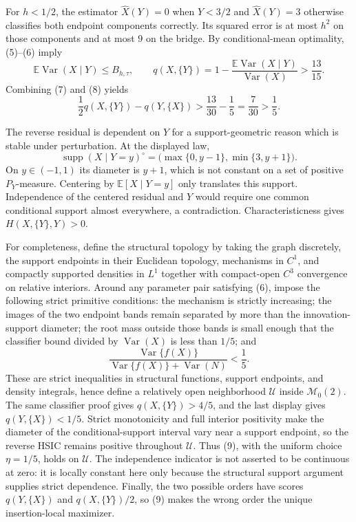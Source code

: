 For \(h<1/2\), the estimator \(\widehat X(Y)=0\) when \(Y<3/2\) and \(\widehat X(Y)=3\) otherwise classifies both endpoint components correctly.  Its squared error is at most \(h^2\) on those components and at most \(9\) on the bridge.  By conditional-mean optimality, (5)--(6) imply
\[
 \mathbb E\operatorname{Var}(X\mid Y)
 \le B_{h,\tau},
 \qquad
 q(X,\{Y\})
 =1-\frac{\mathbb E\operatorname{Var}(X\mid Y)}{\operatorname{Var}(X)}
 >\frac{13}{15}. \tag{8}
\]
Combining (7) and (8) yields
\[
 \frac12q(X,\{Y\})-q(Y,\{X\})
 >\frac{13}{30}-\frac15=\frac7{30}>\frac15. \tag{9}
\]

The reverse residual is dependent on \(Y\) for a support-geometric reason which is stable under perturbation.  At the displayed law,
\[
 \operatorname{supp}(X\mid Y=y)^{\circ}
 =\bigl(\max\{0,y-1\},\min\{3,y+1\}\bigr).
\]
On \(y\in(-1,1)\) its diameter is \(y+1\), which is not constant on a set of positive \(P_Y\)-measure.  Centering by \(\mathbb E[X\mid Y=y]\) only translates this support.  Independence of the centered residual and \(Y\) would require one common conditional support almost everywhere, a contradiction.  Characteristicness gives \(H(X,\{Y\},Y)>0\).

For completeness, define the structural topology by taking the graph discretely, the support endpoints in their Euclidean topology, mechanisms in \(C^1\), and compactly supported densities in \(L^1\) together with compact-open \(C^3\) convergence on relative interiors.  Around any parameter pair satisfying (6), impose the following strict primitive conditions: the mechanism is strictly increasing; the images of the two endpoint bands remain separated by more than the innovation-support diameter; the root mass outside those bands is small enough that the classifier bound divided by \(\operatorname{Var}(X)\) is less than \(1/5\); and
\[
 \frac{\operatorname{Var}\{f(X)\}}
 {\operatorname{Var}\{f(X)\}+\operatorname{Var}(N)}<\frac15.
\]
These are strict inequalities in structural functions, support endpoints, and density integrals, hence define a relatively open neighborhood \(\mathcal U\) inside \(\mathcal M_0(2)\).  The same classifier proof gives \(q(X,\{Y\})>4/5\), and the last display gives \(q(Y,\{X\})<1/5\).  Strict monotonicity and full interior positivity make the diameter of the conditional-support interval vary near a support endpoint, so the reverse HSIC remains positive throughout \(\mathcal U\).  Thus (9), with the uniform choice \(\eta=1/5\), holds on \(\mathcal U\).  The independence indicator is not asserted to be continuous at zero: it is locally constant here only because the structural support argument supplies strict dependence.  Finally, the two possible orders have scores \(q(Y,\{X\})\) and \(q(X,\{Y\})/2\), so (9) makes the wrong order the unique insertion-local maximizer.

